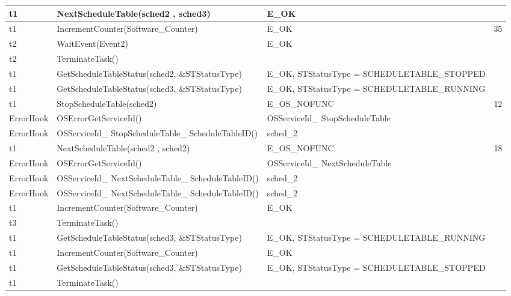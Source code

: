 \documentclass[10pt]{article}
\newlength{\Li}\settowidth{\Li}{Running}
\newlength{\Lii}\setlength{\Lii}{7cm}
\newlength{\Liiii}\setlength{\Liiii}{0.9cm}
\newlength{\Liii}\setlength{\Liii}{\textwidth} \addtolength{\Liii}{-\Li} \addtolength{\Liii}{-\Lii} \addtolength{\Liii}{-\Liiii}
\begin{document}
\begin{supertabular}{|p{\Li}|p{\Lii}|p{\Liii}|p{\Liiii}|}
	t1		& NextScheduleTable(sched2 , sched3)										& E\_OK												& \\ \hline
	
	t1		& IncrementCounter(Software\_Counter)										& E\_OK												& 35 \\ \hline
	t2		& WaitEvent(Event2)														& E\_OK												& \\ \hline
	t2		& TerminateTask()														& 													& \\ \hline

	t1		& GetScheduleTableStatus(sched2, \&STStatusType)							& E\_OK, STStatusType = SCHEDULETABLE\_STOPPED		& \\ \hline
	t1		& GetScheduleTableStatus(sched3, \&STStatusType)							& E\_OK, STStatusType = SCHEDULETABLE\_RUNNING		& \\ \hline	
	t1		& StopScheduleTable(sched2)												& E\_OS\_NOFUNC										& 12 \\ \hline
	ErrorHook	& OSErrorGetServiceId()													& OSServiceId\_ StopScheduleTable						& \\ \hline
	ErrorHook	& OSServiceId\_ StopScheduleTable\_ ScheduleTableID()						& sched\_2											& \\ \hline
	t1		& NextScheduleTable(sched2 , sched2)										& E\_OS\_NOFUNC										& 18\\ \hline
	ErrorHook	& OSErrorGetServiceId()													& OSServiceId\_ NextScheduleTable						& \\ \hline
	ErrorHook	& OSServiceId\_ NextScheduleTable\_ ScheduleTableID()						& sched\_2											& \\ \hline
	ErrorHook	& OSServiceId\_ NextScheduleTable\_ ScheduleTableID()						& sched\_2											& \\ \hline

	t1		& IncrementCounter(Software\_Counter)										& E\_OK												& \\ \hline
	t3		& TerminateTask()														& 													& \\ \hline
	t1		& GetScheduleTableStatus(sched3, \&STStatusType)							& E\_OK, STStatusType = SCHEDULETABLE\_RUNNING		& \\ \hline
	t1		& IncrementCounter(Software\_Counter)										& E\_OK												& \\ \hline
	t1		& GetScheduleTableStatus(sched3, \&STStatusType)							& E\_OK, STStatusType = SCHEDULETABLE\_STOPPED		& \\ \hline


	t1		& TerminateTask()														& 													& \\ \hline
	\end{supertabular}\\
	
\end{document}
